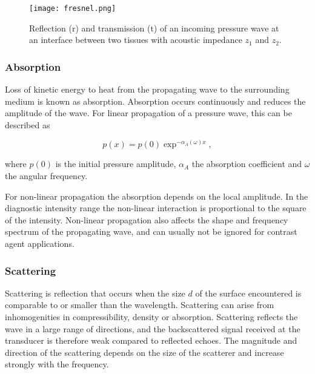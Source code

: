\begin{figure}[h]
	\centering
	\texttt{[image: fresnel.png]}
	\caption{Reflection (r) and transmission (t) of an incoming pressure wave at an interface between two tissues with acoustic impedance $z_1$ and $z_2$.}
	\label{Fig:fresnel}
\end{figure} 

\subsubsection{Absorption}
Loss of kinetic energy to heat from the propagating wave to the surrounding medium is known as absorption. Absorption occurs continuously and reduces the amplitude of the wave. For linear propagation of a pressure wave, this can be described as 

\begin{equation}
p(x) = p(0)\exp^{-\alpha_A(\omega)x},
\end{equation} 

where $p(0)$ is the initial pressure amplitude, $\alpha_A$ the absorption coefficient and $\omega$ the angular frequency.

For non-linear propagation the absorption depends on the local amplitude. In the diagnostic intensity range the non-linear interaction is proportional to the square of the intensity\cite{church1995}. Non-linear propagation also affects the shape and frequency spectrum of the propagating wave, and can usually not be ignored for contrast agent applications\cite{Healey2012}. 

 
\subsubsection{Scattering}
Scattering is reflection that occurs when the size $d$ of the surface encountered is comparable to or smaller than the wavelength. Scattering can arise from inhomogenities in compressibility, density or absorption. Scattering reflects the wave in a large range of directions, and the backscattered signal received at the transducer is therefore weak compared to reflected echoes. The magnitude and direction of the scattering depends on the size of the scatterer and increase strongly with the frequency.  

